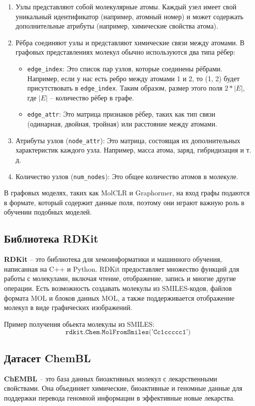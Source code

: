 \begin{enumerate}
    \item  Узлы представляют собой молекулярные атомы. Каждый узел имеет свой уникальный идентификатор (например, атомный номер) и может содержать дополнительные атрибуты (например, химические свойства атома).
    \item Рёбра соединяют узлы и представляют химические связи между атомами. В графовых представлениях молекул обычно используются два типа рёбер:
    \begin{itemize}
        \item \texttt{edge\_index}: Это список пар узлов, которые соединены рёбрами. Например, если у нас есть ребро между атомами 1 и 2, то (1, 2) будет присутствовать в \texttt{edge\_index}. Таким образом, размер этого поля $2*|E|$, где $|E|$ – количество рёбер в графе.
        \item \texttt{edge\_attr}: Это матрица признаков рёбер, таких как тип связи (одинарная, двойная, тройная) или расстояние между атомами.
    \end{itemize}
    \item Атрибуты узлов (\texttt{node\_attr}): Это матрица, состоящая их дополнительных характеристик каждого узла. Например, масса атома, заряд, гибридизация и т. д.
    \item Количество узлов (\texttt{num\_nodes}): Это общее количество атомов в молекуле.
\end{enumerate}
В графовых моделях, таких как MolCLR и Graphormer, на вход графы подаются в формате, который содержит данные поля, поэтому они играют важную роль в обучении подобных моделей.

\subsection{Библиотека RDKit}
\textbf{RDKit} \cite{RDKit} – это библиотека для хемоинформатики и машинного обучения, написанная на C++ и Python. RDKit предоставляет множество функций для работы с молекулами, включая чтение, отображение, запись и многие другие операции.
Есть возможность создавать молекулы из SMILES-кодов, файлов формата MOL и блоков данных MOL, а также поддерживается отображение молекул в виде графических изображений.
 
Пример получения обьекта молекулы из SMILES: 
$$\texttt{rdkit.Chem.MolFromSmiles('Cc1ccccc1')}$$

\subsection{Датасет ChemBL}
\textbf{ChEMBL} \cite{ChemBL} – это база данных биоактивных молекул с лекарственными свойствами. Она объединяет химические, биоактивные и геномные данные для поддержки перевода геномной информации в эффективные новые лекарства.

